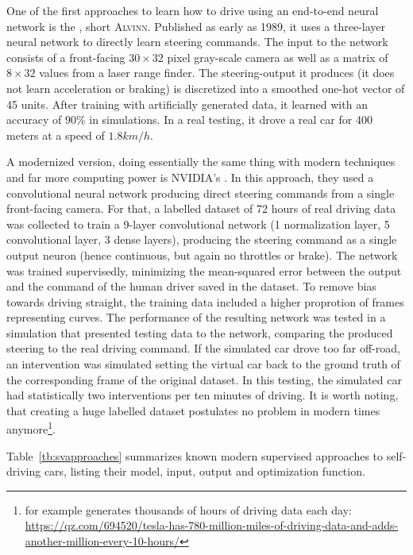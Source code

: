 One of the first approaches to learn how to drive using an end-to-end neural network is the , short \textsc{Alvinn}\cite{pomerleau_alvinn:_1989}. Published as early as 1989, it uses a three-layer neural network to directly learn steering commands. The input to the network consists of a front-facing $30\times32$ pixel gray-scale camera as well as a matrix of $8\times32$ values from a laser range finder. The steering-output it produces (it does not learn acceleration or braking) is discretized into a smoothed one-hot vector of 45 units. After training with artificially generated data, it learned with an accuracy of 90\% in simulations. In a real testing, it drove a real car for 400 meters at a speed of $1.8 km/h$. 

A modernized version, doing essentially the same thing with modern techniques and far more computing power is NVIDIA's \cite{bojarski_end_2016}. In this approach, they used a convolutional neural network producing direct steering commands from a single front-facing camera. For that, a labelled dataset of 72 hours of real driving data was collected to train a 9-layer convolutional network (1 normalization layer, 5 convolutional layer, 3 dense layers), producing the steering command as a single output neuron (hence continuous, but again no throttles or brake). The network was trained supervisedly, minimizing the mean-squared error between the output and the command of the human driver saved in the dataset. To remove bias towards driving straight, the training data included a higher proprotion of frames representing curves. 
The performance of the resulting network was tested in a simulation that presented testing data to the network, comparing the produced steering to the real driving command. If the simulated car drove too far off-road, an intervention was simulated setting the virtual car back to the ground truth of the corresponding frame of the original dataset. In this testing, the simulated car had statistically two interventions per ten minutes of driving. It is worth noting, that creating a huge labelled dataset postulates no problem in modern times anymore\footnote{ for example generates thousands of hours of driving data each day: \url{https://qz.com/694520/tesla-has-780-million-miles-of-driving-data-and-adds-another-million-every-10-hours/}}.

Table~\ref{tb:svapproaches} summarizes known modern supervised approaches to self-driving cars, listing their model, input, output and optimization function.


